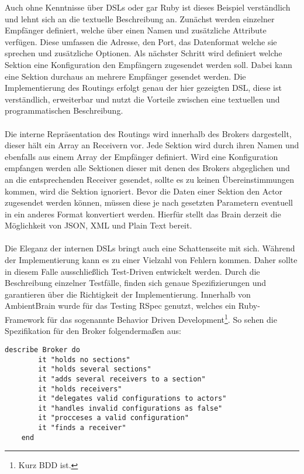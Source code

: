 Auch ohne Kenntnisse über DSLs oder gar Ruby ist dieses Beispiel verständlich und lehnt sich an die textuelle Beschreibung an. Zunächst werden einzelner Empfänger definiert, welche über einen Namen und zusätzliche Attribute verfügen. Diese umfassen die Adresse, den Port, das Datenformat welche sie sprechen und zusätzliche Optionen. Als nächster Schritt wird definiert welche Sektion eine Konfiguration den Empfängern zugesendet werden soll. Dabei kann eine Sektion durchaus an mehrere Empfänger gesendet werden. Die Implementierung des Routings erfolgt genau der hier gezeigten DSL, diese ist verständlich, erweiterbar und nutzt die Vorteile zwischen eine textuellen und programmatischen Beschreibung. 
\\\\
Die interne Repräsentation des Routings wird innerhalb des Brokers dargestellt, dieser hält ein Array an Receivern vor. Jede Sektion wird durch ihren Namen und ebenfalls aus einem Array der Empfänger definiert. Wird eine Konfiguration empfangen werden alle Sektionen dieser mit denen des Brokers abgeglichen und an die entsprechenden Receiver gesendet, sollte es zu keinen Übereinstimmungen kommen, wird die Sektion ignoriert. Bevor die Daten einer Sektion den Actor zugesendet werden können, müssen diese je nach gesetzten Parametern eventuell in ein anderes Format konvertiert werden. Hierfür stellt das Brain derzeit die Möglichkeit von JSON, XML und Plain Text bereit. 
\\\\
Die Eleganz der internen DSLs bringt auch eine Schattenseite mit sich. Während der Implementierung kann es zu einer Vielzahl von Fehlern kommen. Daher sollte in diesem Falle ausschließlich Test-Driven entwickelt werden. Durch die Beschreibung einzelner Testfälle, finden sich genaue Spezifizierungen und garantieren über die Richtigkeit der Implementierung. Innerhalb von AmbientBrain wurde für das Testing RSpec genutzt, welches ein Ruby-Framework für das sogenannte Behavior Driven Development\footnote{Kurz BDD ist.}. So sehen die Spezifikation für den Broker folgendermaßen aus: 

\lstset{language=Ruby}
\begin{lstlisting}[caption=Beschreibung der RSpec-Tests , captionpos=b]
	describe Broker do
		it "holds no sections"
		it "holds several sections"
		it "adds several receivers to a section" 
		it "holds receivers" 
		it "delegates valid configurations to actors" 
		it "handles invalid configurations as false" 
		it "procceses a valid configuration" 
		it "finds a receiver" 
	end

\end{lstlisting}

